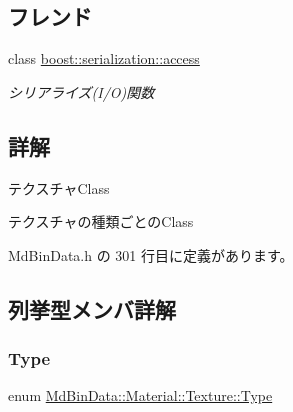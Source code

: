 \subsection*{フレンド}
\begin{DoxyCompactItemize}
\item 
class \mbox{\hyperlink{class_md_bin_data_1_1_material_1_1_texture_ac98d07dd8f7b70e16ccb9a01abf56b9c}{boost\+::serialization\+::access}}
\begin{DoxyCompactList}\small\item\em シリアライズ(I/O)関数 \end{DoxyCompactList}\end{DoxyCompactItemize}


\subsection{詳解}
テクスチャ\+Class 

テクスチャの種類ごとの\+Class 

 Md\+Bin\+Data.\+h の 301 行目に定義があります。



\subsection{列挙型メンバ詳解}
\mbox{\label{class_md_bin_data_1_1_material_1_1_texture_a30fadb7216d0650de284e2fd875868ae}} 
\subsubsection{\texorpdfstring{Type}{Type}}
{\footnotesize\ttfamily enum \mbox{\hyperlink{class_md_bin_data_1_1_material_1_1_texture_a30fadb7216d0650de284e2fd875868ae}{Md\+Bin\+Data\+::\+Material\+::\+Texture\+::\+Type}}\hspace{0.3cm}{\ttfamily [strong]}}

